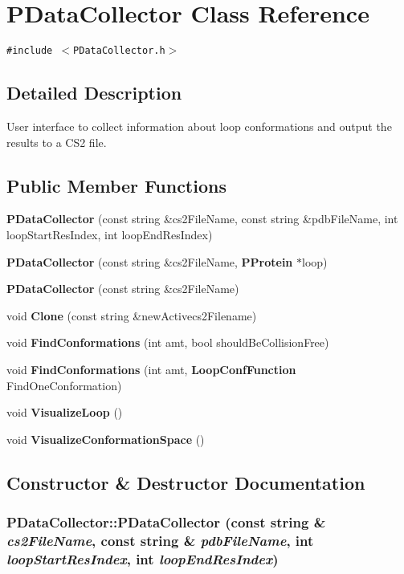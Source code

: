 \section{PData\-Collector Class Reference}
\label{classPDataCollector}
{\tt \#include $<$PData\-Collector.h$>$}



\subsection{Detailed Description}
User interface to collect information about loop conformations and output the results to a CS2 file. 

\subsection*{Public Member Functions}
\begin{CompactItemize}
\item 
{\bf PData\-Collector} (const string \&cs2File\-Name, const string \&pdb\-File\-Name, int loop\-Start\-Res\-Index, int loop\-End\-Res\-Index)
\item 
{\bf PData\-Collector} (const string \&cs2File\-Name, {\bf PProtein} $\ast$loop)
\item 
{\bf PData\-Collector} (const string \&cs2File\-Name)
\item 
void {\bf Clone} (const string \&new\-Activecs2Filename)
\item 
void {\bf Find\-Conformations} (int amt, bool should\-Be\-Collision\-Free)
\item 
void {\bf Find\-Conformations} (int amt, {\bf Loop\-Conf\-Function} Find\-One\-Conformation)
\item 
void {\bf Visualize\-Loop} ()
\item 
void {\bf Visualize\-Conformation\-Space} ()
\end{CompactItemize}


\subsection{Constructor \& Destructor Documentation}
\subsubsection{\setlength{\rightskip}{0pt plus 5cm}PData\-Collector::PData\-Collector (const string \& {\em cs2File\-Name}, const string \& {\em pdb\-File\-Name}, int {\em loop\-Start\-Res\-Index}, int {\em loop\-End\-Res\-Index})}\label{classPDataCollector_bb9bef695b9fd53818ee70f7784485a8}


